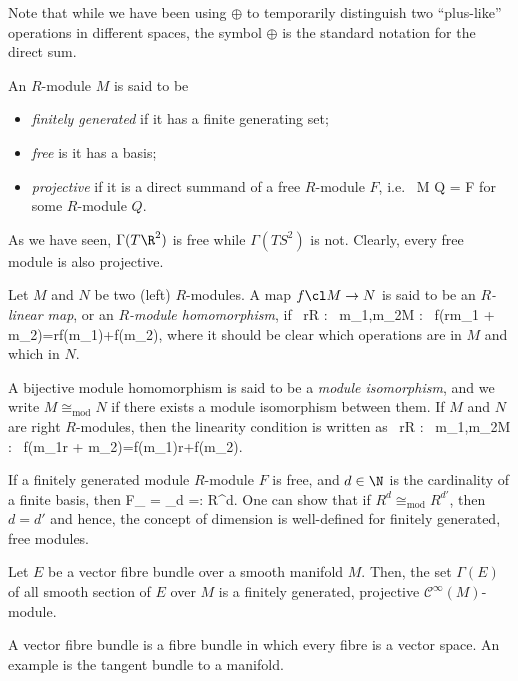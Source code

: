 Note that while we have been using $\oplus$ to temporarily distinguish two ``plus-like'' operations in different spaces, the symbol $\oplus$ is the standard notation for the direct sum.

\bd
An $R$-module $M$ is said to be
\begin{itemize}
\item \emph{finitely generated} if it has a finite generating set;
\item \emph{free} is it has a basis;
\item \emph{projective} if it is a direct summand of a free $R$-module $F$, i.e.\
\bse
M \oplus Q = F
\ese
for some $R$-module $Q$.
\end{itemize}
\ed

\be
As we have seen, $\Gamma(T\R^2)$ is free while $\Gamma(TS^2)$ is not. 
\ee
\be
Clearly, every free module is also projective.
\ee

\bd
Let $M$ and $N$ be two (left) $R$-modules. A map $f\cl M \to N$ is said to be an \emph{$R$-linear map}, or an \emph{$R$-module homomorphism}, if
\bse
\forall \, r\in R : \forall \, m_1,m_2\in M : \ f(rm_1 + m_2)=rf(m_1)+f(m_2),
\ese
where it should be clear which operations are in $M$ and which in $N$.

A bijective module homomorphism is said to be a \emph{module isomorphism}, and we write $M\cong_{\mathrm{mod}}N$ if there exists a module isomorphism between them.
\ed
If $M$ and $N$ are right $R$-modules, then the linearity condition is written as
\bse
\forall \, r\in R : \forall \, m_1,m_2\in M : \ f(m_1r + m_2)=f(m_1)r+f(m_2).
\ese

\bp
If a finitely generated module $R$-module $F$ is free, and $d\in \N$ is the cardinality of a finite basis, then
\bse
F\cong_ = _{d } =: R^d.
\ese
\ep
One can show that if $R^d\cong_\mathrm{mod} R^{d'}$, then $d=d'$ and hence, the concept of dimension is well-defined for finitely generated, free modules.

\begin{theorem}
Let $E$ be a vector fibre bundle over a smooth manifold $M$. Then, the set $\Gamma(E)$ of all smooth section of $E$ over $M$ is a finitely generated, projective $\mathcal{C}^\infty(M)$-module.
\end{theorem}

A vector fibre bundle is a fibre bundle in which every fibre is a vector space. An example is the tangent bundle to a manifold.

